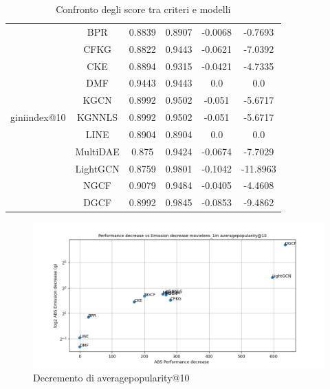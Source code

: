 \begin{table}[H]
{\begin{tabular}{|c|c|c|c|c|c|}
            \multirow{11}{*}{giniindex@10} & BPR & 0.8839 & 0.8907 & -0.0068 & -0.7693 \\ \cline{2-6}
                                            & CFKG & 0.8822 & 0.9443 & -0.0621 & -7.0392 \\ \cline{2-6}
                                            & CKE & 0.8894 & 0.9315 & -0.0421 & -4.7335 \\ \cline{2-6}
                                            & DMF & 0.9443 & 0.9443 & 0.0 & 0.0 \\ \cline{2-6}
                                            & KGCN & 0.8992 & 0.9502 & -0.051 & -5.6717 \\ \cline{2-6}
                                            & KGNNLS & 0.8992 & 0.9502 & -0.051 & -5.6717 \\ \cline{2-6}
                                            & LINE & 0.8904 & 0.8904 & 0.0 & 0.0 \\ \cline{2-6}
                                            & MultiDAE & 0.875 & 0.9424 & -0.0674 & -7.7029 \\ \cline{2-6}
                                            & LightGCN & 0.8759 & 0.9801 & -0.1042 & -11.8963 \\ \cline{2-6}
                                            & NGCF & 0.9079 & 0.9484 & -0.0405 & -4.4608 \\     \cline{2-6}
                                            & DGCF & 0.8992 & 0.9845 & -0.0853 & -9.4862 \\ \cline{2-6}
            \hline
        \end{tabular}
    }
    \caption{Confronto degli score tra criteri e modelli}
    \label{tab:confronto-score}
\end{table}


\begin{figure}[H]
    \centering
     \includegraphics[width=\textwidth]{images/decrement_averagepopularity@10_movielens_1m.png}
    \caption{Decremento di averagepopularity@10}
\end{figure}

